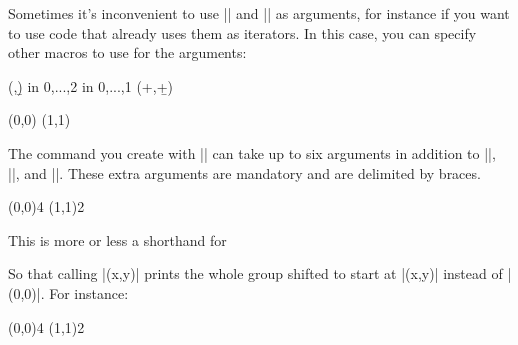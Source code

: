 \documentclass{ltxdoc}
\begin{document}
\begin{sseqdata}[name=ex1,degree={#1}{1-#1}]
\begin{command}{\sseqnewcmd{}}
Sometimes it's inconvenient to use |\x| and |\y| as arguments, for instance if you want to use code that already uses them as iterators. In this case,
you can specify other macros to use for the arguments:
\begin{codeexample}[width=6cm]
\sseqnewcmd\test(\a,\b){
    \foreach \x in {0,...,2} \foreach \y in {0,...,1}{
        \class[\options](\a+\x,\b+\y)
    }
}
\begin{sseqpage}
\test(0,0)
(1,1)
\end{sseqpage}
\end{codeexample}

The command you create with |\sseqnewcmd| can take up to six arguments in addition to |\options|, |\x|, and |\y|. These extra arguments are mandatory and are delimited by braces.
\begin{codeexample}[]
\sseqnewcmd*{}
\begin{sseqpage}
\tower[orange](0,0){4}
\tower[red](1,1){2}
\end{sseqpage}
\end{codeexample}
\end{command}

\begin{command}{\sseqnewgroup{}}
This is more or less a shorthand for
\begin{codeexample}[code only, code=white]
\sseqnewcmd\opt{*}\cscolor{(\obscurexname,\obscureyname)}
\end{codeexample}
So that calling |\mygroup(x,y)| prints the whole group shifted to start at |(x,y)| instead of |(0,0)|. For instance:
\begin{codeexample}[]
\sseqnewgroup*{}
\begin{sseqpage}
\tower[orange](0,0){4}
\tower[red](1,1){2}
\end{sseqpage}
\end{codeexample}
\end{command}


\end{sseqdata}
\end{document}
